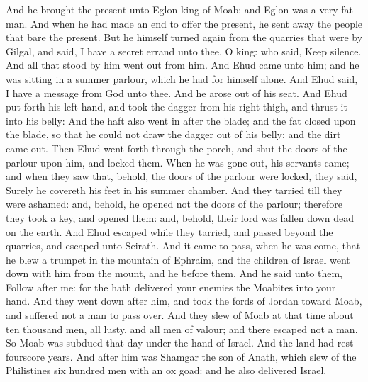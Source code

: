 \begin{biblechapter}
\verse And he brought the present unto Eglon king of Moab: and Eglon was a very fat man.
\verse And when he had made an end to offer the present, he sent away the people that bare the present.
\verse But he himself turned again from the quarries that were by Gilgal, and said, I have a secret errand unto thee, O king: who said, Keep silence. And all that stood by him went out from him.
\verse And Ehud came unto him; and he was sitting in a summer parlour, which he had for himself alone. And Ehud said, I have a message from God unto thee. And he arose out of his seat.
\verse And Ehud put forth his left hand, and took the dagger from his right thigh, and thrust it into his belly:
\verse And the haft also went in after the blade; and the fat closed upon the blade, so that he could not draw the dagger out of his belly; and the dirt came out.
\verse Then Ehud went forth through the porch, and shut the doors of the parlour upon him, and locked them.
\verse When he was gone out, his servants came; and when they saw that, behold, the doors of the parlour were locked, they said, Surely he covereth his feet in his summer chamber.
\verse And they tarried till they were ashamed: and, behold, he opened not the doors of the parlour; therefore they took a key, and opened them: and, behold, their lord was fallen down dead on the earth.
\verse And Ehud escaped while they tarried, and passed beyond the quarries, and escaped unto Seirath.
\verse And it came to pass, when he was come, that he blew a trumpet in the mountain of Ephraim, and the children of Israel went down with him from the mount, and he before them.
\verse And he said unto them, Follow after me: for the \LORD hath delivered your enemies the Moabites into your hand. And they went down after him, and took the fords of Jordan toward Moab, and suffered not a man to pass over.
\verse And they slew of Moab at that time about ten thousand men, all lusty, and all men of valour; and there escaped not a man.
\verse So Moab was subdued that day under the hand of Israel. And the land had rest fourscore years.
 And after him was Shamgar the son of Anath, which slew of the Philistines six hundred men with an ox goad: and he also delivered Israel.
\end{biblechapter}

